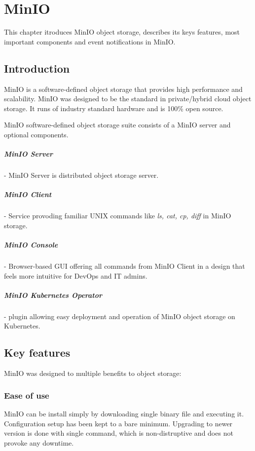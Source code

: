 \chapter{MinIO}
    This chapter itroduces MinIO object storage, describes its keys features, most important components and event notifications in MinIO.

\section{Introduction}
    MinIO is a software-defined object storage that provides high performance and scalability. MinIO was designed to be the standard in private/hybrid cloud object storage.
    It runs of industry standard hardware and is 100\% open source\cite{minioObjectStorage}.

    MinIO software-defined object storage suite consists of a MinIO server and optional components.

    \paragraph{MinIO Server} - MinIO Server is distributed object storage server.
    \paragraph{MinIO Client} - Service provoding familiar UNIX commands like \textit{ls, cat, cp, diff} in MinIO storage.
    \paragraph{MinIO Console} - Browser-based GUI offering all commands from MinIO Client in a design that feels more intuitive for DevOps and IT admins.
    \paragraph{MinIO Kubernetes Operator} - plugin allowing easy deployment and operation of MinIO object storage on Kubernetes.

\section{Key features}
    MinIO was designed to multiple benefits to object storage:

    \subsection*{Ease of use}
    MinIO can be install simply by downloading single binary file and executing it. Configuration setup has been kept to a bare minimum. Upgrading to newer version is done with single command, which is non-distruptive and does not provoke any downtime\cite{minioIntel}.


